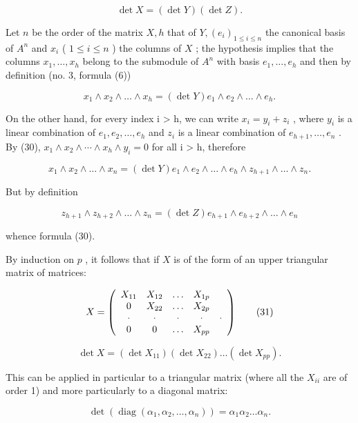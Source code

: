 \[
\det X = (\det Y) (\det Z).
\]

Let \(n\) be the order of the matrix \(X, h\) that of \(Y, (e_i)_{1 \leqslant i \leqslant n}\) the canonical basis of \(A^n\) and \(x_i\) ( \(1 \leqslant i \leqslant n\) ) the columns of \(X\) ; the hypothesis implies that the columns \(x_1, \ldots, x_h\) belong to the submodule of \(A^n\) with basis \(e_1, \ldots, e_h\) and then by definition (no. 3, formula (6))

\[
x _ {1} \wedge x _ {2} \wedge \dots \wedge x _ {h} = (\det Y) e _ {1} \wedge e _ {2} \wedge \dots \wedge e _ {h}.
\]

On the other hand, for every index i \textgreater{} h, we can write \(x_{i} = y_{i} + z_{i}\) , where \(y_{i}\) is a linear combination of \(e_{1}, e_{2}, \ldots, e_{h}\) and \(z_{i}\) is a linear combination of \(e_{h+1}, \ldots, e_{n}\) . By (30), \(x_{1} \wedge x_{2} \wedge \cdots \wedge x_{h} \wedge y_{i} = 0\) for all i \textgreater{} h, therefore

\[
x _ {1} \wedge x _ {2} \wedge \dots \wedge x _ {n} = (\det Y) e _ {1} \wedge e _ {2} \wedge \dots \wedge e _ {h} \wedge z _ {h + 1} \wedge \dots \wedge z _ {n}.
\]

But by definition

\[
z _ {h + 1} \wedge z _ {h + 2} \wedge \dots \wedge z _ {n} = (\det Z) e _ {h + 1} \wedge e _ {h + 2} \wedge \dots \wedge e _ {n}
\]

whence formula (30).

By induction on \(p\) , it follows that if \(X\) is of the form of an upper triangular matrix of matrices:

\[
X = \left( \begin{array}{c c c c c} X _ {1 1} & X _ {1 2} & \ldots & X _ {1 p} \\ 0 & X _ {2 2} & \ldots & X _ {2 p} \\ \cdot & \cdot & \cdot & \cdot & \cdot \\ 0 & 0 & \ldots & X _ {p p} \end{array} \right)\tag{31}
\]

\[
\det X = (\det X _ {1 1}) (\det X _ {2 2}) \dots (\det X _ {p p}).
\]

This can be applied in particular to a triangular matrix (where all the \(X_{ii}\) are of order 1) and more particularly to a diagonal matrix:

\[
\det (\operatorname{diag} \left(\alpha_ {1}, \alpha_ {2}, \dots , \alpha_ {n}\right)) = \alpha_ {1} \alpha_ {2} \dots \alpha_ {n}.\tag{32}
\]

